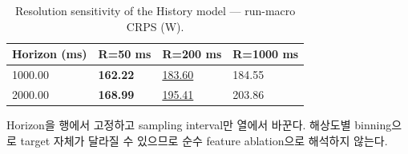 \begin{table}[t]
\centering
\caption{Resolution sensitivity of the History model — run-macro CRPS (W).}
\label{tab:a3b_resolution_sensitivity}
\small
\begin{tabular}{llll}
\toprule
Horizon (ms) & R=50 ms & R=200 ms & R=1000 ms \\
\midrule
1000.00 & \textbf{162.22} & \underline{183.60} & 184.55 \\
2000.00 & \textbf{168.99} & \underline{195.41} & 203.86 \\
\bottomrule
\end{tabular}
\vspace{2pt}\par\footnotesize Horizon을 행에서 고정하고 sampling interval만 열에서 바꾼다. 해상도별 binning으로 target 자체가 달라질 수 있으므로 순수 feature ablation으로 해석하지 않는다.
\end{table}
